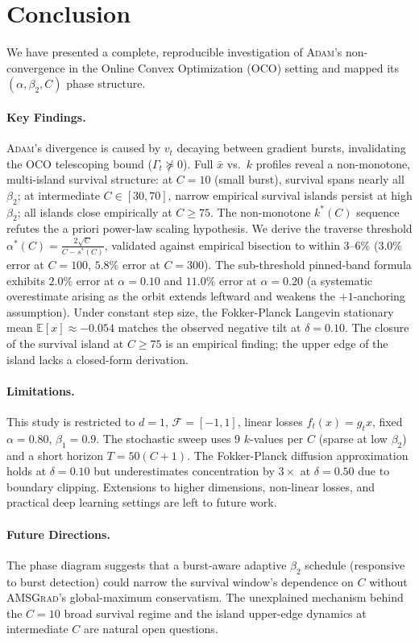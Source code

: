 \section{Conclusion}
\label{sec:conclusion}

We have presented a complete, reproducible investigation of \textsc{Adam}'s non-convergence in the Online Convex Optimization (OCO) setting and mapped its $(\alpha, \beta_2, C)$ phase structure.

\paragraph{Key Findings.}
\textsc{Adam}'s divergence is caused by $v_t$ decaying between gradient bursts, invalidating the OCO telescoping bound ($\Gamma_t \not\succeq 0$). Full $\bar{x}$ vs.\ $k$ profiles reveal a non-monotone, multi-island survival structure: at $C=10$ (small burst), survival spans nearly all $\beta_2$; at intermediate $C \in [30,70]$, narrow empirical survival islands persist at high $\beta_2$; all islands close empirically at $C \ge 75$. The non-monotone $k^*(C)$ sequence refutes the a priori power-law scaling hypothesis. We derive the traverse threshold $\alpha^*(C) = \frac{2\sqrt{C}}{C - s^*(C)}$, validated against empirical bisection to within $3\text{--}6\%$ ($3.0\%$ error at $C=100$, $5.8\%$ error at $C=300$). The sub-threshold pinned-band formula exhibits $2.0\%$ error at $\alpha=0.10$ and $11.0\%$ error at $\alpha=0.20$ (a systematic overestimate arising as the orbit extends leftward and weakens the $+1$-anchoring assumption). Under constant step size, the Fokker-Planck Langevin stationary mean $\mathbb{E}[x] \approx -0.054$ matches the observed negative tilt at $\delta=0.10$. The closure of the survival island at $C \ge 75$ is an empirical finding; the upper edge of the island lacks a closed-form derivation.

\paragraph{Limitations.}
This study is restricted to $d=1$, $\mathcal{F}=[-1,1]$, linear losses $f_t(x) = g_t x$, fixed $\alpha=0.80$, $\beta_1=0.9$. The stochastic sweep uses 9 $k$-values per $C$ (sparse at low $\beta_2$) and a short horizon $T=50(C+1)$. The Fokker-Planck diffusion approximation holds at $\delta=0.10$ but underestimates concentration by $3\times$ at $\delta=0.50$ due to boundary clipping. Extensions to higher dimensions, non-linear losses, and practical deep learning settings are left to future work.

\paragraph{Future Directions.}
The phase diagram suggests that a burst-aware adaptive $\beta_2$ schedule (responsive to burst detection) could narrow the survival window's dependence on $C$ without \textsc{AMSGrad}'s global-maximum conservatism. The unexplained mechanism behind the $C=10$ broad survival regime and the island upper-edge dynamics at intermediate $C$ are natural open questions.
